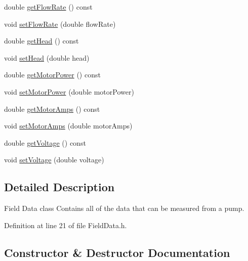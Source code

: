 \begin{DoxyCompactItemize}
\item 
double \hyperlink{class_field_data_a59b3261a5162b002d7b73a2d35561bd0}{get\+Flow\+Rate} () const
\item 
void \hyperlink{class_field_data_ad25c3e5a76b4e493e82d3f70cc3c0ed9}{set\+Flow\+Rate} (double flow\+Rate)
\item 
double \hyperlink{class_field_data_ac3e8e0b2de226c858b6c92cdb454bd0d}{get\+Head} () const
\item 
void \hyperlink{class_field_data_ac72a4f958930000bab0e2b772ee26711}{set\+Head} (double head)
\item 
double \hyperlink{class_field_data_a3e8e1bf84bbd00b9b52b803147968c81}{get\+Motor\+Power} () const
\item 
void \hyperlink{class_field_data_a078e6b4899e7046008ccc9de59bd0272}{set\+Motor\+Power} (double motor\+Power)
\item 
double \hyperlink{class_field_data_ad2b4fffb00fa7cfa6f69487e1034989a}{get\+Motor\+Amps} () const
\item 
void \hyperlink{class_field_data_a4f9373e8a215853b08bbe6a1915fb1a9}{set\+Motor\+Amps} (double motor\+Amps)
\item 
double \hyperlink{class_field_data_a1e8a55965e6cbd8c7b49c0dd5fbee002}{get\+Voltage} () const
\item 
void \hyperlink{class_field_data_a02735cc6956a3fce97bab645ef15dabc}{set\+Voltage} (double voltage)
\end{DoxyCompactItemize}


\subsection{Detailed Description}
Field Data class Contains all of the data that can be measured from a pump. 

Definition at line 21 of file Field\+Data.\+h.



\subsection{Constructor \& Destructor Documentation}
\mbox{\label{class_field_data_a33158a88d05e657bd2c8007bae875454}} 
